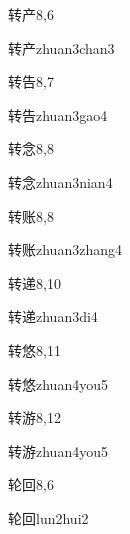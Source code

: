\begin{entry}{转产}{8,6}
  \begin{phonetics}{转产}{zhuan3chan3}
  \end{phonetics}
\end{entry}

\begin{entry}{转告}{8,7}
  \begin{phonetics}{转告}{zhuan3gao4}
  \end{phonetics}
\end{entry}

\begin{entry}{转念}{8,8}
  \begin{phonetics}{转念}{zhuan3nian4}
  \end{phonetics}
\end{entry}

\begin{entry}{转账}{8,8}
  \begin{phonetics}{转账}{zhuan3zhang4}
  \end{phonetics}
\end{entry}

\begin{entry}{转递}{8,10}
  \begin{phonetics}{转递}{zhuan3di4}
  \end{phonetics}
\end{entry}

\begin{entry}{转悠}{8,11}
  \begin{phonetics}{转悠}{zhuan4you5}
  \end{phonetics}
\end{entry}

\begin{entry}{转游}{8,12}
  \begin{phonetics}{转游}{zhuan4you5}
  \end{phonetics}
\end{entry}

\begin{entry}{轮回}{8,6}
  \begin{phonetics}{轮回}{lun2hui2}
  \end{phonetics}
\end{entry}

